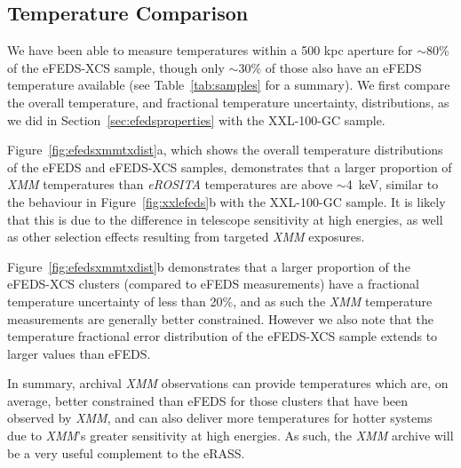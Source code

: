 \documentclass[fleqn,usenatbib]{mnras}
\begin{document}
\subsection{Temperature Comparison}
\label{subsec:tcomp}

We have been able to measure temperatures within a 500 kpc aperture for ${\sim}$80\% of the eFEDS-XCS sample, though only ${\sim}$30\% of those also have an eFEDS temperature available (see Table~\ref{tab:samples} for a summary). We first compare the overall temperature, and fractional temperature uncertainty, distributions, as we did in Section~\ref{sec:efedsproperties} with the XXL-100-GC sample.

Figure~\ref{fig:efedsxmmtxdist}a, which shows the overall temperature distributions of the eFEDS and eFEDS-XCS samples, demonstrates that a larger proportion of {\em XMM} temperatures than {\em eROSITA} temperatures are above ${\sim}$4~keV, similar to the behaviour in Figure~\ref{fig:xxlefeds}b with the XXL-100-GC sample. It is likely that this is due to the difference in telescope sensitivity at high energies, as well as other selection effects resulting from targeted {\em XMM} exposures. 

Figure~\ref{fig:efedsxmmtxdist}b demonstrates that a larger proportion of the eFEDS-XCS clusters (compared to eFEDS measurements) have a fractional temperature uncertainty of less than 20\%, and as such the {\em XMM} temperature measurements are generally better constrained. However we also note that the temperature fractional error distribution of the eFEDS-XCS sample extends to larger values than eFEDS. 

In summary, archival {\em XMM} observations can provide temperatures which are, on average, better constrained than eFEDS for those clusters that have been observed by {\em XMM}, and can also deliver more temperatures for hotter systems due to {\em XMM}'s greater sensitivity at high energies.  As such, the {\em XMM} archive will be a very useful complement to the eRASS.
\end{document}
